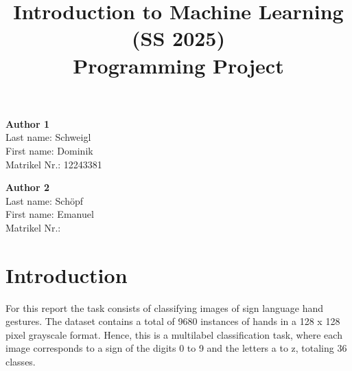 \documentclass[a4, 10 pt, conference]{ieeeconf}  %
\title{\LARGE \bf
Introduction to Machine Learning (SS 2025)\\ Programming Project
\vspace{-3em}
}
\begin{document}
\maketitle
\vspace{-3em}
\thispagestyle{empty}
\pagestyle{empty}

\begin{strip}
\begin{tcolorbox}[
size=tight,
colback=white,
boxrule=0.2mm,
left=3mm,right=3mm, top=3mm, bottom=1mm
]
{\begin{multicols}{3}%

\textbf{Author 1}       \\
Last name:    Schweigl    \\  %
First name:   Dominik    \\  %
Matrikel Nr.: 12243381              \\  %

\columnbreak

\textbf{Author 2}       \\
Last name:    Schöpf          \\  %
First name:   Emanuel          \\  %
Matrikel Nr.:               \\  %

\columnbreak


\end{multicols}}
\end{tcolorbox}
\end{strip}


\section{Introduction}
\label{sec:intro}

For this report the task consists of classifying images of sign language hand gestures.
The dataset contains a total of 9680 instances of hands in a 128 x 128 pixel grayscale format.
Hence, this is a multilabel classification task, where each image corresponds to a
sign of the digits 0 to 9 and the letters a to z, totaling 36 classes.
\end{document}
